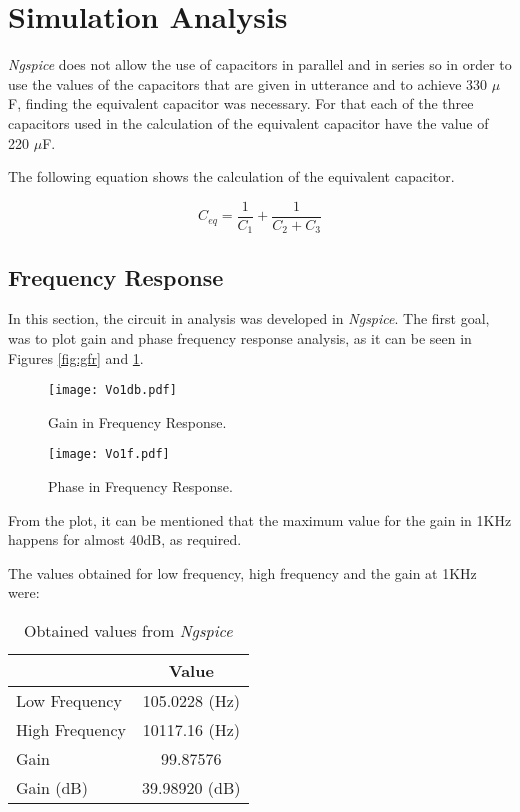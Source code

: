 \section{Simulation Analysis}
\label{sec:simulation}

\textit{Ngspice} does not allow the use of capacitors in parallel and in series so in order to use the values of the capacitors that are given in utterance and to achieve 330 $\mu$F, finding the equivalent capacitor was necessary. For that each of the three capacitors used in the calculation of the equivalent capacitor have the value of 220 $\mu$F.

The following equation shows the calculation of the equivalent capacitor.

\begin{equation}
    C_{eq}= \frac{1}{C_{1}}+\frac{1}{C_{2}+C_{3}} 
\label{eq:vin}
\end{equation} 

\subsection{Frequency Response}
\label{sec:Frequency Response}

In this section, the circuit in analysis was developed in \textit{Ngspice}. The first goal, was to plot gain and phase frequency response analysis, as it can be seen in Figures \ref{fig:gfr} and \ref{fig:pfr}.

\begin{figure}[h]
  \centering
  \begin{minipage}[b]{0.36\textwidth}
    \texttt{[image: Vo1db.pdf]}
    \caption{Gain in Frequency Response.}
    \label{fig:gfr}
  \end{minipage}
  \hfill
  \begin{minipage}[b]{0.36\textwidth}
    \texttt{[image: Vo1f.pdf]}
    \caption{Phase in Frequency Response.}
    \label{fig:pfr}
  \end{minipage}
\end{figure}

\newpage
From the plot, it can be mentioned that the maximum value for the gain in 1KHz happens for almost 40dB, as required. 

The values obtained for low frequency, high frequency and the gain at 1KHz were:

\begin{table}[h]
\centering
\begin{tabular}{|l|c|}
\hline
\multicolumn{1}{|c|}{} & Value         \\ \hline
Low Frequency          & 105.0228 (Hz) \\ \hline
High Frequency         & 10117.16 (Hz) \\ \hline
Gain                   & 99.87576     \\ \hline
Gain (dB)              & 39.98920 (dB)  \\ \hline
\end{tabular}
\caption{Obtained values from \textit{Ngspice}}
\end{table}


